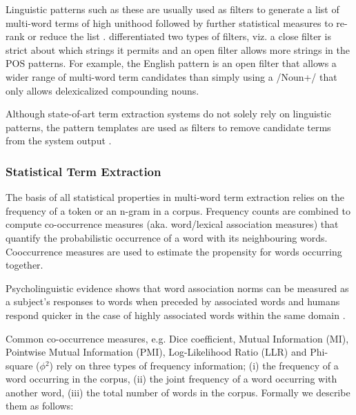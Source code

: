 Linguistic patterns such as these are usually used as filters to generate a list of multi-word
terms of high unithood followed by further statistical measures to re-rank or reduce the list \citep[e.g.][]{bourigault1996lexter}. \cite{frantzi2000automatic} differentiated two types of filters, viz. a close filter is strict about which strings it permits and an open filter allows more strings in the POS patterns. For example, the English pattern is an open filter that allows a wider range of multi-word term candidates than simply using a /Noun+/ that only allows delexicalized compounding nouns. 

Although state-of-art term extraction systems do not solely rely on linguistic patterns, the pattern templates are used as filters to remove candidate terms from the system output \citep[e.g.][]{zhang2004comparison,gomez2009parallel}.


\subsubsection{Statistical Term Extraction}

The basis of all statistical properties in multi-word term extraction relies on the frequency of a token or an n-gram in a corpus. Frequency counts are combined to compute co-occurrence measures (aka. word/lexical association measures) that quantify the probabilistic occurrence of a word with its neighbouring words. Cooccurrence measures are used to estimate the propensity for words occurring together.

Psycholinguistic evidence shows that word association norms can be measured as a subject’s responses to words when preceded by associated words \citep{palermo-jenkins} and humans respond quicker in the case of highly associated words within the same domain \citep{church1990word}.

Common co-occurrence measures, e.g. Dice coefficient, Mutual Information (MI), Pointwise Mutual Information (PMI), Log-Likelihood Ratio (LLR) and Phi-square ($\phi$$^{2}$) rely on three types of frequency information; (i) the frequency of a word occurring in the corpus, (ii) the joint frequency of a word occurring with another word, (iii) the total number of words in the corpus. Formally we describe them as follows:

